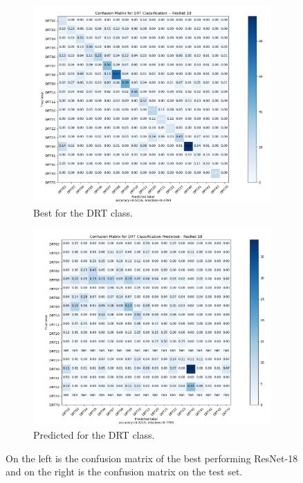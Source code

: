 \begin{figure}
{\begin{subfigure}[b]{.6\textwidth}
\centering
\includegraphics[width=.95\textwidth]{figures/04-drt_best.PNG}
\caption{Best for the DRT class.}
\label{fig:rescm_drt}
\end{subfigure}%
\begin{subfigure}[b]{.6\textwidth}
\centering
\includegraphics[width=.95\textwidth]{figures/04-drt_pred.PNG}
\caption{Predicted for the DRT class.}
\label{fig:rescm_drt_pred}
\end{subfigure}%
}
\caption[Confusion matrices of classes trained on ResNet-18]{On the left is the confusion matrix of the best performing ResNet-18 and on the right is the confusion matrix on the test set.}
\label{fig:rescm}
\end{figure}

